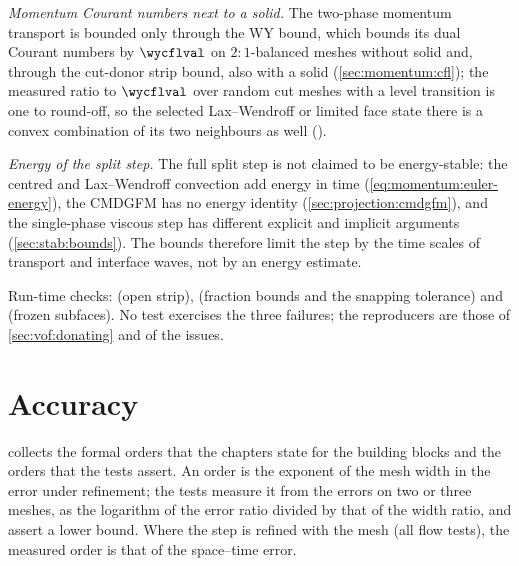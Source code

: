 \emph{Momentum Courant numbers next to a solid.} The two-phase momentum
transport is bounded only through the WY bound, which bounds its dual
Courant numbers by $\wycflval$ on $2{:}1$-balanced meshes without solid and,
through the cut-donor strip bound, also with a solid
(\cref{sec:momentum:cfl}); the measured ratio to $\wycflval$ over random cut
meshes with a level transition is one to round-off, so the selected Lax--Wendroff
or limited face state there is a convex combination of its two neighbours as
well ().

\emph{Energy of the split step.} The full split step is not claimed to be
energy-stable: the centred and Lax--Wendroff convection add energy in time
(\cref{eq:momentum:euler-energy}), the CMDGFM has no energy identity
(\cref{sec:projection:cmdgfm}), and the single-phase viscous step has
different explicit and implicit arguments (\cref{sec:stab:bounds}). The
bounds therefore limit the step by the time scales of transport and
interface waves, not by an energy estimate.

\begin{implnote}
Run-time checks:  (open strip),
 (fraction bounds and the snapping
tolerance) and 
(frozen subfaces). No test exercises the three failures; the
reproducers are those of \cref{sec:vof:donating} and of the issues.
\end{implnote}

\section{Accuracy}\label{sec:stab:accuracy}
 collects the formal orders that the chapters state for
the building blocks and the orders that the tests assert. An order is the
exponent of the mesh width in the error under refinement; the tests measure
it from the errors on two or three meshes, as the logarithm of the error
ratio divided by that of the width ratio, and assert a lower bound. Where the
step is refined with the mesh (all flow tests), the measured order is that of
the space--time error.

